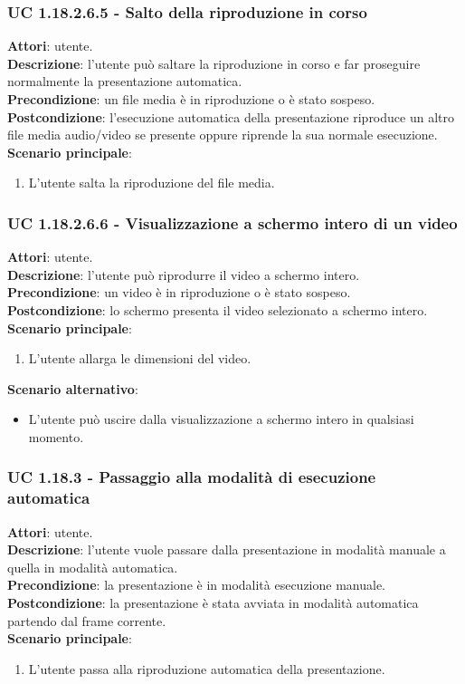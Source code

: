 	\subsubsection{UC 1.18.2.6.5 - Salto della riproduzione in corso}{
		\label{uc1.18.2.6.5}
		\textbf{Attori}: utente. \\
		\textbf{Descrizione}: l'utente può saltare la riproduzione in corso e far proseguire normalmente la presentazione automatica. \\
		\textbf{Precondizione}: un file media è in riproduzione o è stato sospeso.	\\
		\textbf{Postcondizione}: l'esecuzione automatica della presentazione riproduce un altro file media audio/video se presente oppure riprende la sua normale esecuzione.\\
		\textbf{Scenario principale}:
		\begin{enumerate}
			\item L'utente salta la riproduzione del file media.
		\end{enumerate}						
	}
	\subsubsection{UC 1.18.2.6.6 - Visualizzazione a schermo intero di un video}{
		\label{uc1.18.2.6.6}
		\textbf{Attori}: utente. \\
		\textbf{Descrizione}: l'utente può riprodurre il video a schermo intero. \\
		\textbf{Precondizione}: un video è in riproduzione o è stato sospeso.	\\
		\textbf{Postcondizione}: lo schermo presenta il video selezionato a schermo intero.\\
		\textbf{Scenario principale}:
		\begin{enumerate}
			\item L'utente allarga le dimensioni del video.
		\end{enumerate}	
		\textbf{Scenario alternativo}:
		\begin{itemize}
			\item L'utente può uscire dalla visualizzazione a schermo intero in qualsiasi momento.
		\end{itemize}
	}
	\subsubsection{UC 1.18.3 - Passaggio alla modalità di esecuzione automatica}{
		\label{uc1.18.3}
		\textbf{Attori}: utente. \\
		\textbf{Descrizione}: l'utente vuole passare dalla presentazione in modalità manuale a quella in modalità automatica. \\
		\textbf{Precondizione}: la presentazione è in modalità esecuzione manuale.	\\
		\textbf{Postcondizione}: la presentazione è stata avviata in modalità automatica partendo dal frame corrente.\\
		\textbf{Scenario principale}:
		\begin{enumerate}
			\item L'utente passa alla riproduzione automatica della presentazione.
		\end{enumerate}						
	}
